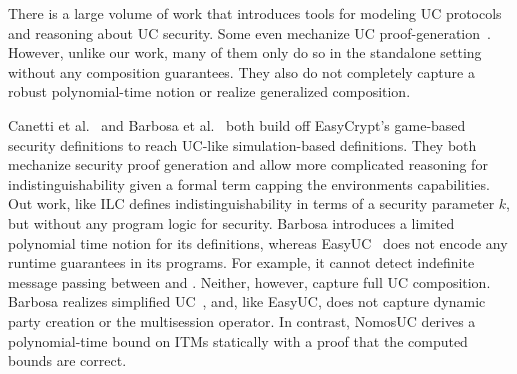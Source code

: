 There is a large volume of work that introduces tools for modeling UC protocols and reasoning about UC security.
Some even mechanize UC proof-generation~\cite{certicrypt, easycrypt, cryptoverif, cryptol, fstar}.
However, unlike our work, many of them only do so in the standalone setting without any composition guarantees.
They also do not completely capture a robust polynomial-time notion or realize generalized composition. 

Canetti et al.~\cite{easyuc} and Barbosa et al.~\cite{barbosa} both build off EasyCrypt's game-based security definitions to reach UC-like simulation-based definitions.
They both mechanize security proof generation and allow more complicated reasoning for indistinguishability given a formal term capping the environments capabilities. Out work, like ILC defines indistinguishability in terms of a security parameter $k$, but without any program logic for security. 
Barbosa introduces a limited polynomial time notion for its definitions, whereas EasyUC~\cite{easyuc} does not encode any runtime guarantees in its programs. 
For example, it cannot detect indefinite message passing between \A and \F. Neither, however, capture full UC composition.
Barbosa realizes simplified UC~\cite{suc}, and, like EasyUC, does not capture dynamic party creation or the multisession operator.
In contrast, NomosUC derives a polynomial-time bound on ITMs statically with a proof that the computed bounds are correct.

